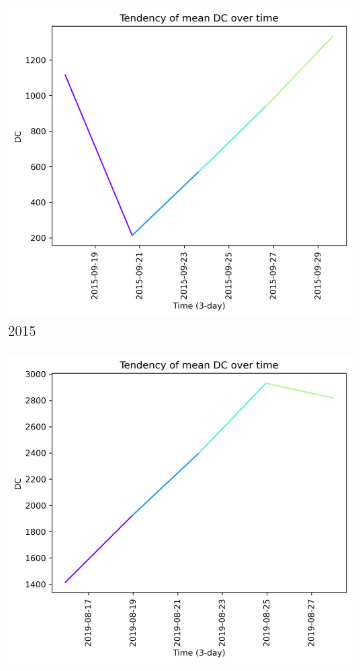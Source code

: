 \begin{figure}[h]
    \centering
    \caption{DC values 15 days prior to wildfire}
    \begin{subfigure}{0.3\textwidth}
        \centering
        \includegraphics[width=\textwidth]{graphs/2015/15daysprior/2015_15daysprior_tendency_graph_DC.png}
        \caption{2015}
        \label{fig:dc_prior_15_days_2015}
    \end{subfigure}
    \hfill
    \begin{subfigure}{0.3\textwidth}
        \centering
        \includegraphics[width=\textwidth]{graphs/2019/15daysprior/2019_15daysprior_tendency_graph_DC.png}

\end{subfigure}
\end{figure}
